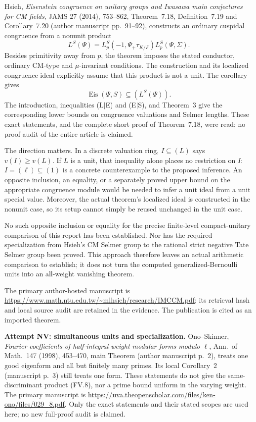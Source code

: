 \documentclass[11pt,a4paper]{article}
\theoremstyle{definition}
\renewcommand{\paragraph}[1]{\par\smallskip\noindent\textbf{#1}\quad\ignorespaces}
\begin{document}
Hsieh, \emph{Eisenstein congruence on unitary groups and Iwasawa
main conjectures for CM fields}, JAMS 27 (2014), 753--862,
Theorem~7.18, Definition~7.19 and Corollary~7.20
(author manuscript pp.~91--92), constructs an ordinary cuspidal
congruence from a nonunit product
\[
 L^S(\Psi)=L_p^S(-1,\Psi_+\tau_{K/F})L_p^S(\Psi,\Sigma).
\]
Besides primitivity away from $p$, the theorem imposes the
stated conductor, ordinary CM-type and $\mu$-invariant conditions.
The construction and its localized congruence ideal explicitly
assume that this product is not a unit. The corollary gives
\[
                \operatorname{Eis}(\Psi,S)\subseteq(L^S(\Psi)).
\]
The introduction, inequalities (L$\mid$E) and (E$\mid$S),
and Theorem~3 give the corresponding lower bounds on
congruence valuations and Selmer lengths. These exact
statements, and the complete short proof of Theorem~7.18,
were read; no proof audit of the entire article is claimed.

The direction matters. In a discrete valuation ring,
$I\subseteq(L)$ says $v(I)\geq v(L)$. If $L$ is a unit,
that inequality alone places no restriction on $I$:
$I=(\ell)\subseteq(1)$ is a concrete counterexample to
the proposed inference. An opposite inclusion, an equality,
or a separately proved upper bound on the appropriate
congruence module would be needed to infer a unit ideal
from a unit special value. Moreover, the actual theorem's
localized ideal is constructed in the nonunit case, so
its setup cannot simply be reused unchanged in the unit case.

No such opposite inclusion or equality for the precise
finite-level compact-unitary comparison of this report
has been established. Nor has the required specialization
from Hsieh's CM Selmer group to the rational strict negative
Tate Selmer group been proved. This approach therefore leaves
an actual arithmetic comparison to establish; it does not
turn the computed generalized-Bernoulli units into an
all-weight vanishing theorem.

The primary author-hosted manuscript is
\url{https://www.math.ntu.edu.tw/~mlhsieh/research/IMCCM.pdf};
its retrieval hash and local source audit are retained in the
evidence. The publication is cited as an imported theorem.

\paragraph{Attempt NV: simultaneous units and specialization.}
Ono--Skinner, \emph{Fourier coefficients of half-integral weight
modular forms modulo $\ell$}, Ann.\ of Math.\ 147 (1998),
453--470, main Theorem (author manuscript p.~2), treats one
good eigenform and all but finitely many primes. Its local
Corollary~2 (manuscript p.~3) still treats one form. These
statements do not give the same-discriminant product (FV.8),
nor a prime bound uniform in the varying weight. The primary
manuscript is
\url{https://uva.theopenscholar.com/files/ken-ono/files/029_8.pdf}.
Only the exact statements and their stated scopes are used here;
no new full-proof audit is claimed.
\end{document}
